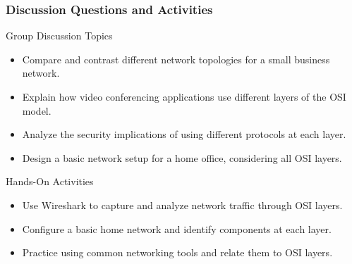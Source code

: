 \documentclass{beamer}
\begin{document}
\begin{frame}
    \frametitle{Discussion Questions and Activities}
    
    \begin{block}{Group Discussion Topics}
        \begin{itemize}
            \item Compare and contrast different network topologies for a small business network.
            
            \item Explain how video conferencing applications use different layers of the OSI model.
            
            \item Analyze the security implications of using different protocols at each layer.
            
            \item Design a basic network setup for a home office, considering all OSI layers.
        \end{itemize}
    \end{block}
    
    \begin{alertblock}{Hands-On Activities}
        \begin{itemize}
            \item Use Wireshark to capture and analyze network traffic through OSI layers.
            \item Configure a basic home network and identify components at each layer.
            \item Practice using common networking tools and relate them to OSI layers.
        \end{itemize}
    \end{alertblock}
\end{frame}
\end{document}
